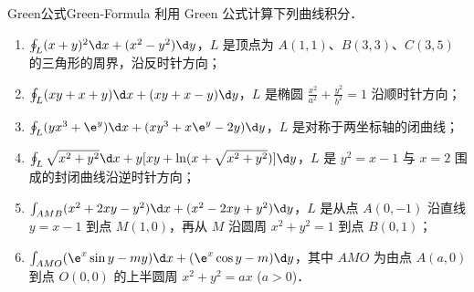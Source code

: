 \begin{problem}{Green公式}{Green-Formula}
    利用 Green 公式计算下列曲线积分．
    \begin{enumerate}
        \item $\oint_L (x+y)^2 \d x + (x^2-y^2) \d y$，$L$ 是顶点为 $A(1,1)$、$B(3,3)$、$C(3,5)$ 的三角形的周界，沿反时针方向；
        \item $\oint_L (xy+x+y) \d x + (xy+x-y) \d y$，$L$ 是椭圆 $\frac{x^2}{a^2} + \frac{y^2}{b^2} = 1$ 沿顺时针方向；
        \item $\oint_L (y x^3 + \e^y) \d x + (x y^3 + x \e^y - 2y) \d y$，$L$ 是对称于两坐标轴的闭曲线；
        \item $\oint_L \sqrt{x^2+y^2} \d x + y[xy + \ln (x + \sqrt{x^2+y^2})] \d y$，$L$ 是 $y^2 = x-1$ 与 $x=2$ 围成的封闭曲线沿逆时针方向；
        \item $\int_{AMB} (x^2+2xy-y^2) \d x + (x^2-2xy+y^2) \d y$，$L$ 是从点 $A(0,-1)$ 沿直线 $y=x-1$ 到点 $M(1,0)$，再从 $M$ 沿圆周 $x^2+y^2=1$ 到点 $B(0,1)$；
        \item $\int_{AMO} (\e^x \sin y - my) \d x + (\e^x \cos y - m) \d y$，其中 $AMO$ 为由点 $A(a,0)$ 到点 $O(0,0)$ 的上半圆周 $x^2+y^2=ax$ ($a>0$)．
    \end{enumerate}
\end{problem}


